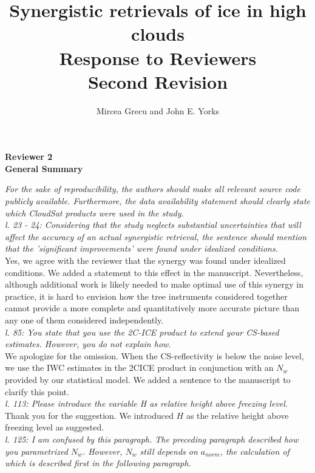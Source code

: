 \documentclass[12pt]{article}
\author{Mircea Grecu and John E. Yorks}
\title{Synergistic retrievals of ice in high clouds\\
Response to Reviewers\\Second Revision}
\date{}
\begin{document}
\maketitle


\noindent \textbf{Reviewer 2}\\
\noindent \textbf{General Summary}

\noindent\textit{ 
For the sake of reproducibility, the authors should make all relevant source code publicly available. Furthermore, the data availability statement should clearly state which CloudSat products were used in the study.}\\

\noindent\textit{l. 23 - 24: Considering that the study neglects substantial uncertainties that will affect the accuracy of an actual synergistic retrieval, the sentence should mention that the 'significant improvements' were found under idealized conditions.}\\

\noindent Yes, we agree with the reviewer that the synergy was found under idealized conditions. We added a statement to this effect in the manuscript. Nevertheless, although additional work is likely needed to make optimal use of this synergy in practice, it is hard to envision how the tree instruments considered together cannot provide a more complete and quantitatively more accurate picture than any one of them considered independently.\\

\noindent\textit{l. 85: You state that you use the 2C-ICE product to extend your CS-based estimates. However, you do not explain how.} \\

\noindent We apologize for the omission. When the CS-reflectivity is below the noise level, we use the IWC estimates in the 2C\-ICE product in conjunction with an $N_w$ provided by our statistical model. We added a sentence to the manuscript to clarify this point.\\

\noindent\textit{l. 113: Please introduce the variable H as relative height above freezing level.}\\

Thank you for the suggestion. We introduced $H$ as the relative height above freezing level as suggested.\\

\noindent\textit{l. 125: I am confused by this paragraph. The preceding paragraph described how you parametrized $N_w$. However, $N_w$ still depends on $a_{norm}$, the calculation of which is described first in the following paragraph.}\\
\end{document}

